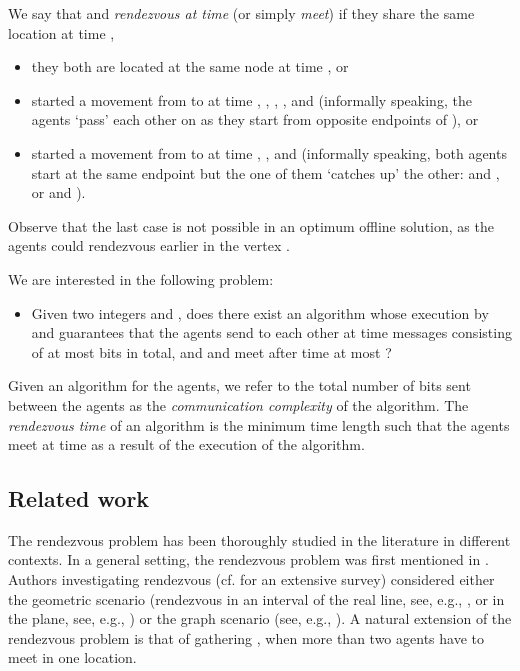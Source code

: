 \documentclass{llncs}
\begin{document}
We say that  and  \emph{rendezvous at time } 
(or simply \emph{meet}) if they share the same location at time ,
\begin{itemize}
 \item they both are located at the same node at time , or
 \item  started a movement from  to  at time , , , ,  and  (informally speaking, the agents `pass' each other on  as they start from opposite endpoints of ), or
 \item  started a movement from  to  at time , ,  and  (informally speaking, both agents start at the same endpoint but the one of them `catches up' the other:  and , or  and ).
\end{itemize}

Observe that the last case is not possible in an optimum offline solution, as the agents could rendezvous earlier in the vertex .

\noindent
We are interested in the following problem:
\begin{itemize}
 \item[] Given two integers  and , does there exist an algorithm whose execution by  and  guarantees that the agents send to each other at time  messages consisting of at most  bits in total, and  and  meet after time at most ?
\end{itemize}

Given an algorithm for the agents, we refer to the total number of bits sent between the agents as the \emph{communication complexity} of the algorithm.
The \emph{rendezvous time} of an algorithm is the minimum time length  such that the agents meet at time  as a result of the execution of the algorithm.

\subsection{Related work}
The rendezvous problem has been thoroughly studied in the literature in different contexts.
In a general setting, the rendezvous problem was first mentioned in \cite{schelling60}. 
Authors investigating  rendezvous (cf.\cite{opac-b1117985} for an extensive survey) considered either the geometric scenario (rendezvous in an interval of the real line, see, e.g.,  \cite{baston98,BasG01,gal99}, 
or in the plane, see, e.g., \cite{anderson98a,anderson98b}) or the graph scenario (see, e.g.,  \cite{DessmarkFKP06,FP08,KM}). 
A natural extension of the rendezvous problem is that of gathering \cite{FPSW05,IJ90,lim96,thomas92}, 
when more than two agents have to meet in one location.
\end{document}
